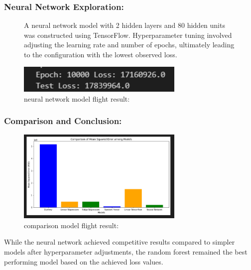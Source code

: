 \documentclass{article}
\begin{document}
\subsubsection{Neural Network Exploration:}

\begin{figure}[H]
    A neural network model with 2 hidden layers and 80 hidden units was constructed using TensorFlow. Hyperparameter tuning involved adjusting the learning rate and number of epochs, ultimately leading to the configuration with the lowest observed loss.
    \caption{neural network model flight result:}
    \centering
    \includegraphics[width=8cm]{imgFolder/neuronNetworkFlight.png}
\end{figure}

\subsubsection{Comparison and Conclusion:}
\begin{figure}[H]
    \caption{comparison model flight result:}
    \centering
    \includegraphics[width=8cm]{imgFolder/comparisonFlight.png}
\end{figure}
While the neural network achieved competitive results compared to simpler models after hyperparameter adjustments, the random forest remained the best performing model based on the achieved loss values.
\end{document}
